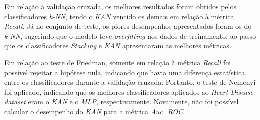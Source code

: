 \documentclass[journal]{IEEEtran}
\begin{document}
Em relação à validação cruzada, os melhores resultados foram obtidos pelos classificadores \textit{k-NN}, tendo o \textit{KAN} vencido os demais em relação à métrica \textit{Recall}. Já no conjunto de teste, os piores desempenhos apresentados foram os do \textit{k-NN}, sugerindo que o modelo teve \textit{overfitting} nos dados de treinamento, ao passo que os classificadores \textit{Stacking} e \textit{KAN} apresentaram as melhores métricas.

Em relação ao teste de Friedman, somente em relação à métrica \textit{Recall} foi possível rejeitar a hipótese nula, indicando que havia uma diferença estatística entre os classificadores durante a validação cruzada. Portanto, o teste de Nemenyi foi aplicado, indicando que os melhores classificadores aplicados ao \textit{Heart Disease dataset} eram o \textit{KAN} e o \textit{MLP}, respectivamente.
Novamente, não foi possível calcular o desempenho do \textit{KAN} para a métrica \textit{Auc\_ROC}.
\end{document}
